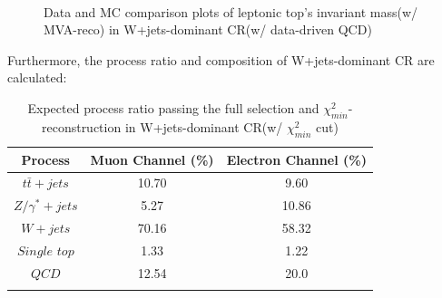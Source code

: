 		\begin{figure}[H]
		\centering
			\\
		\caption{Data and MC comparison plots of leptonic top's invariant mass(w/ MVA-reco) in W+jets-dominant CR(w/ data-driven QCD)}
		\label{EventSelReco:fig:a05_MLP_CR1_1C_Mlb_DD}
		\end{figure}
		\FloatBarrier

		Furthermore, the process ratio and composition of W+jets-dominant CR are calculated:

		\begin{center}
		\begin{longtable}[H]{ c c c }
		\caption{Expected process ratio passing the full selection and $\chi^2_{min}$-reconstruction in W+jets-dominant CR(w/ $\chi^2_{min}$ cut)}\\
		\hline
		 Process & Muon Channel (\%) & Electron Channel (\%) \\ 
		\hline
		 $t\bar{t}+jets$ & 10.70 & 9.60 \\
		 $Z/\gamma^{*}+jets$ & 5.27 &  10.86 \\
		 $W+jets$ & 70.16 & 58.32 \\
		 $Single$ $top$ & 1.33 & 1.22 \\
		 $QCD$ & 12.54 & 20.0 \\
		\hline
		\label{EventSelReco:tb:MC_process_CR_a05_MLP_1C}
		\end{longtable}
		\end{center}
		\FloatBarrier


